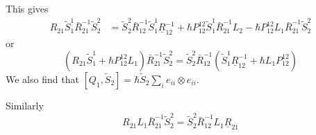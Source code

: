 \documentclass[11pt]{report}
\theoremstyle{definition}
\theoremstyle{remark}
\theoremstyle{remark}
\begin{document}
This gives
\begin{align*}
R_{21} \tilde S_1^1 \bar R_{21}^{-1} \tilde S_2^2
&= \tilde S_2^2 \bar R_{12}^{-1} \tilde S_1^1 \underline{R}_{12}^{-1} + \hbar P_{12}^{12} \tilde S_1^1 \bar R_{21}^{-1} L_2 - \hbar P_{12}^{12} L_1 \bar R_{21}^{-1} \tilde S_2^2
\end{align*}
or
\begin{equation*}
(R_{21} \tilde S_1^1 + \hbar P_{12}^{12} L_1) \bar R_{21}^{-1} \tilde S_2^2 = \tilde S_2^2 \bar R_{12}^{-1} (\tilde S_1^1 \underline{R}_{12}^{-1} + \hbar L_1 P_{12}^{12})
\end{equation*}
We also find that $[Q_1,\tilde S_2] = \hbar \tilde S_2 \sum_i e_{ii} \otimes e_{ii}$.

Similarly
\begin{equation*}
R_{21} L_1 \bar R_{21}^{-1} \tilde S_2^2
= \tilde S_2^2 \bar R_{12}^{-1} L_1 \underline{R}_{21}
\end{equation*}
\end{document}

